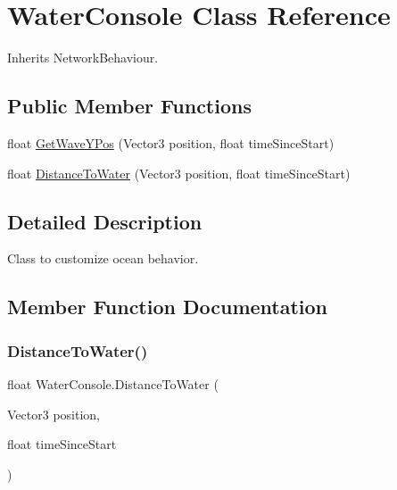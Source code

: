\hypertarget{class_water_console}{}\section{Water\+Console Class Reference}
\label{class_water_console}


Inherits Network\+Behaviour.

\subsection*{Public Member Functions}
\begin{DoxyCompactItemize}
\item 
float \hyperlink{class_water_console_aab7b61cf764417ae88f2ad3aac5f33ca}{Get\+Wave\+Y\+Pos} (Vector3 position, float time\+Since\+Start)
\item 
float \hyperlink{class_water_console_ab21c13f7838f38d0b9abba1e1c9fe81f}{Distance\+To\+Water} (Vector3 position, float time\+Since\+Start)
\end{DoxyCompactItemize}


\subsection{Detailed Description}
Class to customize ocean behavior. 



\subsection{Member Function Documentation}
\mbox{\label{class_water_console_ab21c13f7838f38d0b9abba1e1c9fe81f}} 
\subsubsection{\texorpdfstring{Distance\+To\+Water()}{DistanceToWater()}}
{\footnotesize\ttfamily float Water\+Console.\+Distance\+To\+Water (\begin{DoxyParamCaption}\item[{Vector3}]{position,  }\item[{float}]{time\+Since\+Start }\end{DoxyParamCaption})}



